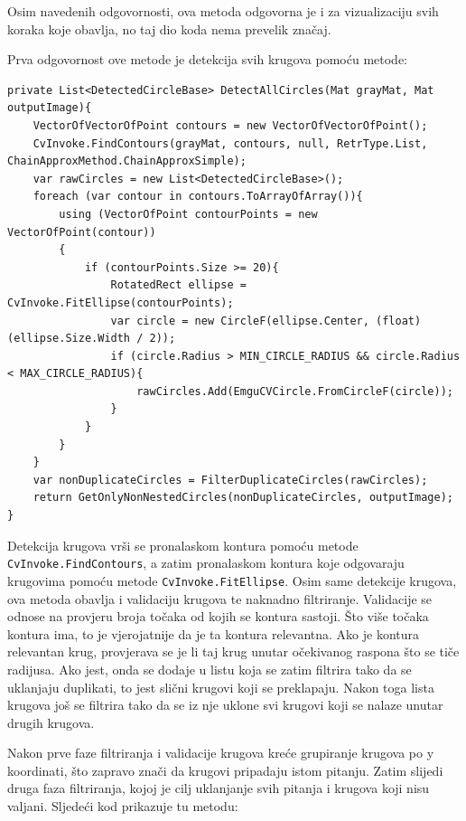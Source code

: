 \documentclass{foi}
\begin{document}
Osim navedenih odgovornosti, ova metoda odgovorna je i za vizualizaciju svih koraka koje obavlja, no taj dio koda nema prevelik značaj.

Prva odgovornost ove metode je detekcija svih krugova pomoću metode:

\begin{lstlisting}[caption={Metoda za detektciju svih krugova na slici}]
private List<DetectedCircleBase> DetectAllCircles(Mat grayMat, Mat outputImage){
    VectorOfVectorOfPoint contours = new VectorOfVectorOfPoint();
    CvInvoke.FindContours(grayMat, contours, null, RetrType.List, ChainApproxMethod.ChainApproxSimple);
    var rawCircles = new List<DetectedCircleBase>();
    foreach (var contour in contours.ToArrayOfArray()){
        using (VectorOfPoint contourPoints = new VectorOfPoint(contour))
        {
            if (contourPoints.Size >= 20){
                RotatedRect ellipse = CvInvoke.FitEllipse(contourPoints);
                var circle = new CircleF(ellipse.Center, (float)(ellipse.Size.Width / 2));
                if (circle.Radius > MIN_CIRCLE_RADIUS && circle.Radius < MAX_CIRCLE_RADIUS){
                    rawCircles.Add(EmguCVCircle.FromCircleF(circle));
                }
            }
        }
    }
    var nonDuplicateCircles = FilterDuplicateCircles(rawCircles);
    return GetOnlyNonNestedCircles(nonDuplicateCircles, outputImage);
}
\end{lstlisting}

Detekcija krugova vrši se pronalaskom kontura pomoću metode \texttt{CvInvoke.FindContours}, a zatim pronalaskom kontura koje odgovaraju krugovima pomoću metode \texttt{CvInvoke.FitEllipse}. Osim same detekcije krugova, ova metoda obavlja i validaciju krugova te naknadno filtriranje. Validacije se odnose na provjeru broja točaka od kojih se kontura sastoji. Što više točaka kontura ima, to je vjerojatnije da je ta kontura relevantna. Ako je kontura relevantan krug, provjerava se je li taj krug unutar očekivanog raspona što se tiče radijusa. Ako jest, onda se dodaje u listu koja se zatim filtrira tako da se uklanjaju duplikati, to jest slični krugovi koji se preklapaju. Nakon toga lista krugova još se filtrira tako da se iz nje uklone svi krugovi koji se nalaze unutar drugih krugova.


\pagebreak
Nakon prve faze filtriranja i validacije krugova kreće grupiranje krugova po y koordinati, što zapravo znači da krugovi pripadaju istom pitanju. Zatim slijedi druga faza filtriranja, kojoj je cilj uklanjanje svih pitanja i krugova koji nisu valjani. Sljedeći kod prikazuje tu metodu:
\end{document}
